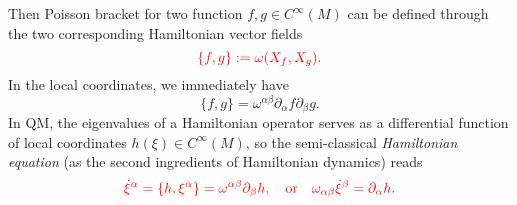 \documentclass[10pt,nofootinbib,letterpaper]{revtex4}
\begin{document}
		Then Poisson bracket for two function $f,g\in C^\infty(M)$ can be defined through the two corresponding Hamiltonian vector fields
		\begin{equation}\label{1.1.1}
			{\color{red}\{f,g\}:=\omega(X_f,X_g).}
		\end{equation}
		In the local coordinates, we immediately have
		\begin{equation}\label{1.1.2}
			\{f,g\}=\omega^{\alpha \beta}\partial_\alpha f\partial_\beta g.
		\end{equation}
		\indent In QM, the eigenvalues of a Hamiltonian operator serves as a differential function of local coordinates $h(\xi)\in C^\infty(M)$, so the semi-classical \emph{Hamiltonian equation} (as the second ingredients of Hamiltonian dynamics) reads
		\begin{equation}\label{1.1.3}
			{\color{red}\dot{\xi}^\alpha=\{h,\xi^\alpha\}=\omega^{\alpha\beta}\partial_\beta h,\quad \text{or}\quad\omega_{\alpha\beta}\dot{\xi}^\beta=\partial_\alpha h}.
		\end{equation}
\end{document}
